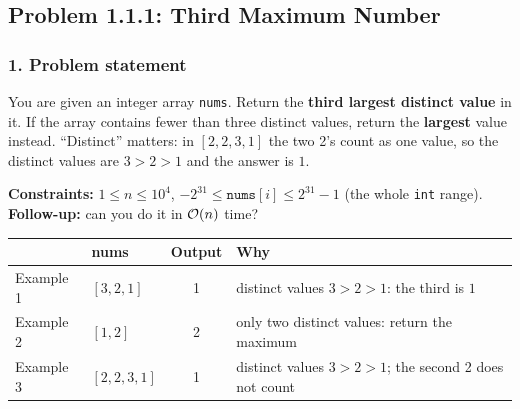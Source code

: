 \subsection{Problem 1.1.1: Third Maximum Number}


\subsubsection*{1. Problem statement}

You are given an integer array \texttt{nums}. Return the \textbf{third largest distinct value} in it. If the array contains fewer than three distinct values, return the \textbf{largest} value instead. ``Distinct'' matters: in $[2, 2, 3, 1]$ the two 2's count as one value, so the distinct values are $3 > 2 > 1$ and the answer is $1$.

\textbf{Constraints:} $1 \le n \le 10^4$, \; $-2^{31} \le \texttt{nums}[i] \le 2^{31} - 1$ (the whole \texttt{int} range). \textbf{Follow-up:} can you do it in $\mathcal{O}(n)$ time?

\begin{table}[H]
\centering\small
\begin{tabular}{@{}llcl@{}}
\toprule
& \textbf{nums} & \textbf{Output} & \textbf{Why} \\
\midrule
Example 1 & $[3, 2, 1]$ & 1 & distinct values $3 > 2 > 1$: the third is $1$ \\
Example 2 & $[1, 2]$ & 2 & only two distinct values: return the maximum \\
Example 3 & $[2, 2, 3, 1]$ & 1 & distinct values $3 > 2 > 1$; the second 2 does not count \\
\bottomrule
\end{tabular}
\end{table}

\begin{diagrambox}
\end{diagrambox}

